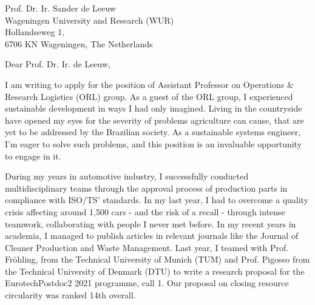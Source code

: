 \documentclass[sender,
    paper=a4,
    version=last,
    fontsize=12pt,
    DIV=13,
    BCOR=0mm]{scrlttr2}
\begin{document}

\newcommand{\position}{Postdoctoral fellow, Rethinking global raw material supply chains in a post COVID-19 world}
\newcommand{\recipient}{Kleijn}

\begin{letter}{
    Prof. Dr. Ir. Sander de Leeuw \\
    Wageningen University and Research (WUR)\\
    Hollandseweg 1, \\
    6706 KN Wageningen, The Netherlands
} 

\opening{Dear Prof. Dr. Ir. de Leeuw,}


\parindent8mm

I am writing to apply for the position of Assistant Professor on Operations \& Research  Logistics (ORL) group. As a guest of the ORL group, I experienced sustainable development in ways I had only imagined. Living in the countryside have opened my eyes for the severity of problems agriculture can cause, that are yet to be addressed by the Brazilian society. As a sustainable systems engineer, I'm eager to solve such problems, and this position is an invaluable opportunity to engage in it. 

During my years in automotive industry, I successfully conducted multidisciplinary teams through the approval process of production parts in compliance with ISO/TS' standards. In my last year, I had to overcome a quality crisis affecting around 1,500 cars - and the risk of a recall - through intense teamwork, collaborating with people I never met before. In my recent years in academia, I managed to publish articles in relevant journals like the Journal of Cleaner Production and Waste Management. Last year, I teamed with Prof. Fröhling, from the Technical University of Munich (TUM) and Prof. Pigosso from the Technical University of Denmark (DTU) to write a research proposal for the EurotechPostdoc2 2021 programme, call 1. Our proposal on closing resource circularity was ranked 14th overall.


\end{letter}
\end{document}
